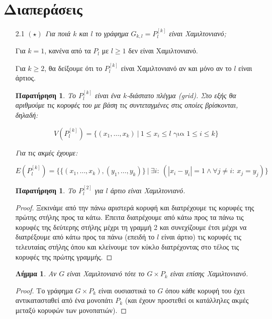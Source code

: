 \documentclass[a4paper, oneside, 11pt]{article}
\newtheorem{lm}[thm]{Λήμμα}
\newtheorem{obsrv}[thm]{Παρατήρηση}
\theoremstyle{definition}
\begin{document}
\section{Διαπεράσεις}
\begin{enumerate}
   \item[2.1] \emph{$(\star)$ Για ποιά $k$ και $l$ το γράφημα
              $G_{k, l} = P_l^{[k]}$ είναι Χαμιλτονιανό;}

   Για $k = 1$, κανένα από τα $P_l$ με $l \geq 1$ δεν είναι Χαμιλτονιανό.

   Για $k \geq 2$, θα δείξουμε ότι το $P_l^{[k]}$ είναι Χαμιλτονιανό
   αν και μόνο αν το $l$ είναι άρτιος.

   \begin{obsrv}
      Το $P_l^{[k]}$ είναι ένα $k$-διάστατο πλέγμα (grid). Στο εξής
      θα αριθμούμε τις κορυφές του με βάση τις συντεταγμένες
      στις οποίες βρίσκονται, δηλαδή:

      \[ V(P_l^{[k]}) = \{ (x_1, \ldots, x_k)\ |\  1 \leq x_i \leq l \text{ για }
      1 \leq i \leq k \} \]

      Για τις ακμές έχουμε:

      \[ E(P_l^{[k]}) = \{ \{ (x_1, \ldots, x_k), (y_1, \ldots, y_k) \}
         \ |\ \exists i:\ (|x_i - y_i| = 1
         \land \forall j \neq i:\ x_j = y_j) \} \]
   \end{obsrv}

   \begin{obsrv}
      \label{lm2.1.1}
      Το $P_l^{[2]}$ για $l$ άρτιο είναι Χαμιλτονιανό.
   \end{obsrv}
   \begin{proof}
      Ξεκινάμε από την πάνω αριστερά κορυφή και διατρέχουμε τις
      κορυφές της πρώτης στήλης προς τα κάτω. Έπειτα διατρέχουμε
      από κάτω προς τα πάνω τις κορυφές της δεύτερης στήλης
      μέχρι τη γραμμή 2 και συνεχίζουμε έτσι μέχρι να διατρέξουμε
      από κάτω προς τα πάνω (επειδή το $l$ είναι άρτιο) τις κορυφές
      τις τελευταίας στήλης όπου και κλείνουμε τον κύκλο διατρέχοντας
      στο τέλος τις κορυφές της πρώτης γραμμής.
   \end{proof}

   \begin{lm}
      \label{lm2.1.2}
      Αν $G$ είναι Χαμιλτονιανό τότε το $G \times P_k$ είναι επίσης
      Χαμιλτονιανό.
   \end{lm}
   \begin{proof}
      Το γράφημα $G \times P_k$ είναι ουσιαστικά το $G$ όπου κάθε κορυφή του
      έχει αντικατασταθεί από ένα μονοπάτι $P_k$ (και έχουν προστεθεί οι
      κατάλληλες ακμές μεταξύ κορυφών των μονοπατιών).


\end{proof}
\end{enumerate}
\end{document}
